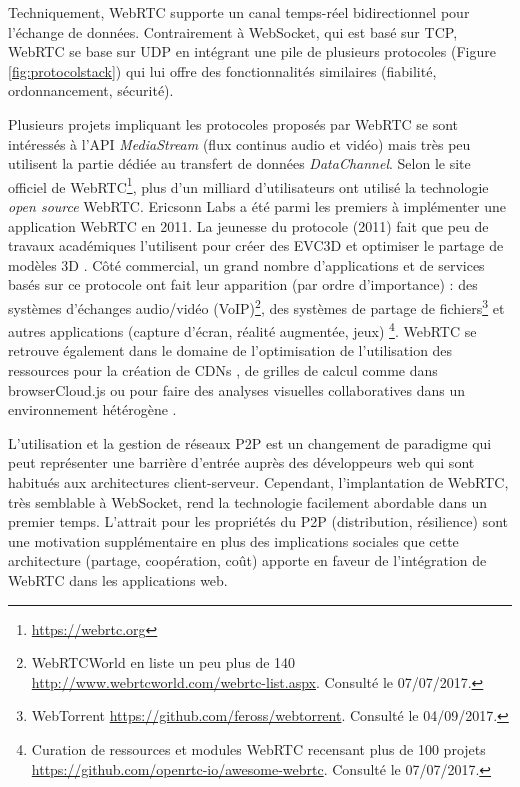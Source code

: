 Techniquement, \gls{WebRTC} supporte un canal temps-réel 
bidirectionnel pour l'échange de données. Contrairement à 
\gls{WebSocket}, qui est basé sur \gls{TCP}, \gls{WebRTC} se base sur 
\acrshort{UDP} en intégrant une pile de plusieurs protocoles (Figure 
\ref{fig:protocolstack}) qui lui offre des fonctionnalités similaires (fiabilité, 
ordonnancement, sécurité). 


Plusieurs projets impliquant les protocoles proposés par \gls{WebRTC} 
se sont intéressés à l'\gls{API} \textit{MediaStream} (flux continus audio 
et vidéo) mais très peu utilisent la partie dédiée au transfert de données 
\textit{DataChannel}. 
Selon le site officiel de WebRTC\footnote{\url{https://webrtc.org}}, plus d'un milliard 
d'utilisateurs ont utilisé la technologie \textit{open source} WebRTC. Ericsonn Labs 
a été parmi les premiers à implémenter une application WebRTC en 2011. 
La jeunesse du protocole (2011) fait que peu de travaux académiques 
l'utilisent pour créer des \gls{EVC3D} \cite{Desprat2015a,Steiakaki2016} et 
optimiser le partage de modèles 3D \cite{Koskela2014}. 
Côté commercial, un grand nombre d'applications et de services 
basés sur ce protocole ont fait leur apparition (par ordre d'importance) : 
des systèmes d'échanges audio/vidéo (VoIP)\footnote{WebRTCWorld en 
	liste un peu plus de 140 
	\url{http://www.webrtcworld.com/webrtc-list.aspx}. Consulté le 
	07/07/2017.}, des systèmes de partage de fichiers\footnote{WebTorrent 
	\url{https://github.com/feross/webtorrent}. Consulté le 04/09/2017.} et 
autres applications (capture d'écran, réalité augmentée, jeux)
\footnote{Curation de ressources et modules WebRTC 
	recensant plus de 100 projets 
	\url{https://github.com/openrtc-io/awesome-webrtc}. Consulté le 
	07/07/2017.}. WebRTC se retrouve également dans le domaine de l'optimisation 
	de l'utilisation des ressources pour la création de \glspl{CDN} 
	\cite{Zhang2013b}, de grilles de calcul comme dans
	browserCloud.js \cite{Dias2015a} ou pour faire des analyses visuelles 
	collaboratives dans un environnement hétérogène \cite{Li2015}.


L'utilisation et la gestion de réseaux \gls{P2P} est un changement de paradigme 
qui peut représenter une 
barrière d'entrée auprès des développeurs web qui sont habitués aux architectures 
client-serveur. 
Cependant, l'implantation de WebRTC, très semblable à WebSocket, rend la 
technologie facilement abordable dans un premier temps. L'attrait pour les 
propriétés du \gls{P2P} (distribution, résilience) sont une motivation 
supplémentaire en plus des implications sociales que cette architecture (partage, 
coopération, coût) apporte en faveur de l'intégration de WebRTC dans les 
applications web.

